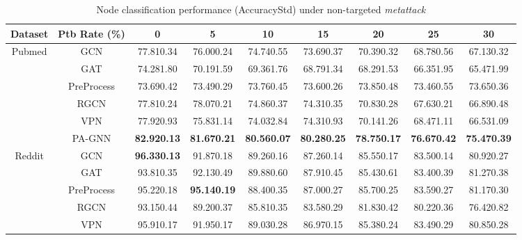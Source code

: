 \documentclass[sigconf]{acmart}
\newcommand{\our}{{PA-GNN}\xspace}
\begin{document}
\begin{table*}[!t]
\small
    \setlength{\tabcolsep}{8pt}
    \caption{Node classification performance (AccuracyStd) under non-targeted \textit{metattack} \cite{zugner2018adversarial2}}\label{tab:nontarget}
    \vspace{-1.5em}
\centering
    \begin{tabular}{c|c|ccccccc}
\hline \hline
              Dataset      & Ptb Rate (\%)        & 0              & 5              & 10             & 15             & 20             & 25             & 30             \\ \hline
\multirow{6}{*}{Pubmed}     & GCN                  & 77.810.34 & 76.000.24 & 74.740.55 & 73.690.37 & 70.390.32 & 68.780.56 & 67.130.32 \\
                            & GAT                  & 74.281.80 & 70.191.59 & 69.361.76 & 68.791.34 & 68.291.53 & 66.351.95 & 65.471.99 \\
                            & PreProcess           & 73.690.42 & 73.490.29 & 73.760.45 & 73.600.26 & 73.850.48 & 73.460.55 & 73.650.36 \\
                            & RGCN                 & 77.810.24 & 78.070.21 & 74.860.37 & 74.310.35 & 70.830.28 & 67.630.21 & 66.890.48 \\
                            & VPN              & 77.920.93 & 75.831.14 & 74.032.84 & 74.310.93 & 70.141.26 & 68.471.11 & 66.531.09 \\
                            & \our & \textbf{82.920.13} & \textbf{81.670.21} & \textbf{80.560.07} & \textbf{80.280.25} & \textbf{78.750.17} & \textbf{76.670.42} & \textbf{75.470.39} \\
                            \hline
\multirow{6}{*}{Reddit}     & GCN                  & \textbf{96.330.13} & 91.870.18 & 89.260.16 & 87.260.14 & 85.550.17 & 83.500.14 & 80.920.27 \\
                            & GAT                  & 93.810.35 & 92.130.49 & 89.880.60 & 87.910.45 & 85.430.61 & 83.400.39 & 81.270.38 \\
                            & PreProcess           & 95.220.18 & \textbf{95.140.19} & 88.400.35 & 87.000.27 & 85.700.25 & 83.590.27 & 81.170.30 \\
                            & RGCN                 & 93.150.44 & 89.200.37 & 85.810.35 & 83.580.29 & 81.830.42 & 80.220.36 & 76.420.82 \\
                            & VPN              & 95.910.17 & 91.950.17 & 89.030.28 & 86.970.15 & 85.380.24 & 83.490.29 & 80.850.28 \\

\end{tabular}
\end{table*}
\end{document}
